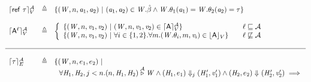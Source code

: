 \begin{figure*}[!htbp]
\begin{displaymath}
\begin{array}{lll}
    \lceil \mathsf{ref} ~ \tau \rceil_{V}^{\mathcal{A}} & \triangleq & \{(\mathit{W}, n, \mathit{a}_1,  \mathit{a}_2) ~|~
                     (\mathit{a}_1 , \mathit{a}_2) \in \mathit{W}.\hat{\beta}
                       \wedge \mathit{W}.\theta_1(\mathit{a}_1) = \mathit{W}.\theta_2(\mathit{a}_2) = \tau \}\\ \\
\lceil \mathsf{A}^{\ell} \rceil_{V}^{\mathcal{A}} & \triangleq &
\left\lbrace
  \begin{array}{l r r}
    \{(\mathit{W}, n, \mathit{v}_1,  \mathit{v}_2) ~|~
    (\mathit{W}, n, \mathit{v}_1, \mathit{v}_2) \in \lceil \mathsf{A} \rceil_{V}^{\mathcal{A}} \} & & \ell \sqsubseteq \mathcal{A} \\

    \{(\mathit{W}, n, \mathit{v}_1,  \mathit{v}_2) ~|~
    \forall i\in \{1,2\}. \forall m. (\mathit{W}.\theta_i, m, \mathit{v}_i) \in \lfloor \mathsf{A} \rfloor_{V} \} & & \ell \not\sqsubseteq \mathcal{A}
  \end{array}
\right. \\ \\
\hline \\
    \lceil \tau \rceil_{E}^{\mathcal{A}} & \triangleq & \{(\mathit{W}, n, e_1, e_2) ~|~\\
                   &   & ~~\forall \mathit{H}_1, \mathit{H}_2, j<n. (n, \mathit{H}_1, \mathit{H}_2) \overset{\mathcal{A}}\triangleright \mathit{W} \wedge
                   (\mathit{H}_1, e_1) \Downarrow_{j} (\mathit{H}_1', \mathit{v}_1') \wedge
                         (\mathit{H}_2, e_2) \Downarrow_{} (\mathit{H}_2', \mathit{v}_2') \implies \\


\end{array}
\end{displaymath}
\end{figure*}
